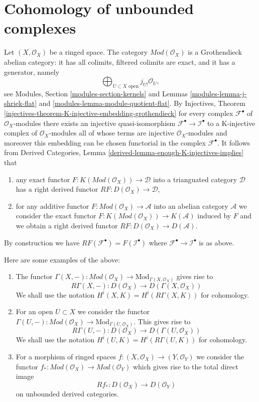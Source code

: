 \section{Cohomology of unbounded complexes}
\label{cohomology-section-unbounded}
Let $(X, \mathcal{O}_X)$ be a ringed space.
The category $\textit{Mod}(\mathcal{O}_X)$ is a Grothendieck
abelian category: it has all colimits,
filtered colimits are exact, and it has a generator, namely
$$
\bigoplus\nolimits_{U \subset X\text{ open}} j_{U!}\mathcal{O}_U,
$$
see Modules, Section \ref{modules-section-kernels} and
Lemmas \ref{modules-lemma-j-shriek-flat} and
\ref{modules-lemma-module-quotient-flat}.
By Injectives, Theorem
\ref{injectives-theorem-K-injective-embedding-grothendieck}
for every complex $\mathcal{F}^\bullet$ of $\mathcal{O}_X$-modules
there exists an injective quasi-isomorphism
$\mathcal{F}^\bullet \to \mathcal{I}^\bullet$ to a K-injective complex
of $\mathcal{O}_X$-modules all of whose terms are injective
$\mathcal{O}_X$-modules and moreover this embedding can be
chosen functorial in the complex $\mathcal{F}^\bullet$.
It follows from
Derived Categories, Lemma \ref{derived-lemma-enough-K-injectives-implies}
that
\begin{enumerate}
\item any exact functor $F : K(\textit{Mod}(\mathcal{O}_X)) \to \mathcal{D}$
into a trianguated category $\mathcal{D}$ has a right derived functor
$RF : D(\mathcal{O}_X) \to \mathcal{D}$,
\item for any additive functor
$F : \textit{Mod}(\mathcal{O}_X) \to \mathcal{A}$
into an abelian category $\mathcal{A}$ we consider the exact functor
$F : K(\textit{Mod}(\mathcal{O}_X)) \to K(\mathcal{A})$ induced by $F$
and we obtain a right derived functor
$RF : D(\mathcal{O}_X) \to D(\mathcal{A})$.
\end{enumerate}
By construction we have $RF(\mathcal{F}^\bullet) = F(\mathcal{I}^\bullet)$
where $\mathcal{F}^\bullet \to \mathcal{I}^\bullet$ is as above.

\medskip\noindent
Here are some examples of the above:
\begin{enumerate}
\item The functor $\Gamma(X, -) : \textit{Mod}(\mathcal{O}_X) \to
\text{Mod}_{\Gamma(X, \mathcal{O}_X)}$ gives rise to
$$
R\Gamma(X, -) : D(\mathcal{O}_X) \to D(\Gamma(X, \mathcal{O}_X))
$$
We shall use the notation $H^i(X, K) = H^i(R\Gamma(X, K))$ for cohomology.
\item For an open $U \subset X$ we consider the functor
$\Gamma(U, -) : \textit{Mod}(\mathcal{O}_X) \to
\text{Mod}_{\Gamma(U, \mathcal{O}_X)}$. This gives rise to
$$
R\Gamma(U, -) : D(\mathcal{O}_X) \to D(\Gamma(U, \mathcal{O}_X))
$$
We shall use the notation $H^i(U, K) = H^i(R\Gamma(U, K))$ for cohomology.
\item For a morphism of ringed spaces
$f : (X, \mathcal{O}_X) \to (Y, \mathcal{O}_Y)$ we consider the functor
$f_* : \textit{Mod}(\mathcal{O}_X) \to \textit{Mod}(\mathcal{O}_Y)$
which gives rise to the total direct image
$$
Rf_* : D(\mathcal{O}_X) \longrightarrow D(\mathcal{O}_Y)
$$
on unbounded derived categories.
\end{enumerate}

